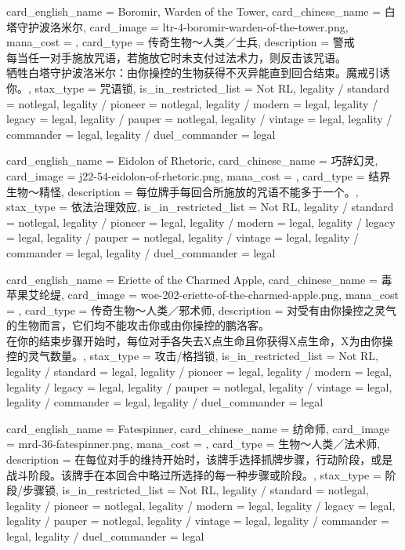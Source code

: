 \documentclass[lang = cn, color = black, 10pt]{AllThatStax}
\begin{document}
\card
{
	card_english_name = {Boromir, Warden of the Tower},
	card_chinese_name = {白塔守护波洛米尔},
	card_image = ltr-4-boromir-warden-of-the-tower.png,
	mana_cost = ,
	card_type = 传奇生物～人类／士兵,
	description = {警戒\\
每当任一对手施放咒语，若施放它时未支付过法术力，则反击该咒语。\\
牺牲白塔守护波洛米尔：由你操控的生物获得不灭异能直到回合结束。魔戒引诱你。},
	stax_type = 咒语锁,
	is_in_restricted_list = Not RL,
	legality / standard = notlegal,
	legality / pioneer = notlegal,
	legality / modern = legal,
	legality / legacy = legal,
	legality / pauper = notlegal,
	legality / vintage = legal,
	legality / commander = legal,
	legality / duel_commander = legal
}

\card
{
	card_english_name = {Eidolon of Rhetoric},
	card_chinese_name = {巧辞幻灵},
	card_image = j22-54-eidolon-of-rhetoric.png,
	mana_cost = ,
	card_type = 结界生物～精怪,
	description = {每位牌手每回合所施放的咒语不能多于一个。},
	stax_type = 依法治理效应,
	is_in_restricted_list = Not RL,
	legality / standard = notlegal,
	legality / pioneer = legal,
	legality / modern = legal,
	legality / legacy = legal,
	legality / pauper = notlegal,
	legality / vintage = legal,
	legality / commander = legal,
	legality / duel_commander = legal
}

\card
{
	card_english_name = {Eriette of the Charmed Apple},
	card_chinese_name = {毒苹果艾纶缇},
	card_image = woe-202-eriette-of-the-charmed-apple.png,
	mana_cost = ,
	card_type = 传奇生物～人类／邪术师,
	description = {对受有由你操控之灵气的生物而言，它们均不能攻击你或由你操控的鹏洛客。\\
在你的结束步骤开始时，每位对手各失去X点生命且你获得X点生命，X为由你操控的灵气数量。},
	stax_type = 攻击/格挡锁,
	is_in_restricted_list = Not RL,
	legality / standard = legal,
	legality / pioneer = legal,
	legality / modern = legal,
	legality / legacy = legal,
	legality / pauper = notlegal,
	legality / vintage = legal,
	legality / commander = legal,
	legality / duel_commander = legal
}

\card
{
	card_english_name = {Fatespinner},
	card_chinese_name = {纺命师},
	card_image = mrd-36-fatespinner.png,
	mana_cost = ,
	card_type = 生物～人类／法术师,
	description = {在每位对手的维持开始时，该牌手选择抓牌步骤，行动阶段，或是战斗阶段。该牌手在本回合中略过所选择的每一种步骤或阶段。},
	stax_type = 阶段/步骤锁,
	is_in_restricted_list = Not RL,
	legality / standard = notlegal,
	legality / pioneer = notlegal,
	legality / modern = legal,
	legality / legacy = legal,
	legality / pauper = notlegal,
	legality / vintage = legal,
	legality / commander = legal,
	legality / duel_commander = legal
}
\end{document}
